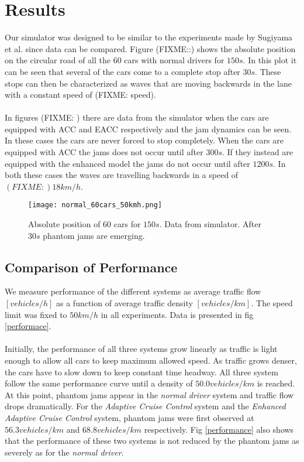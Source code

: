 \section{Results}
Our simulator was designed to be similar to the experiments made by Sugiyama
et al.\cite{sugiyama} since data can be compared. Figure (FIXME::) shows
the absolute position on the circular road of all the 60 cars with normal
drivers for $ 150 \unit{s} $. In this plot it can be seen that several of the
cars come to a complete stop after $ 30 \unit{s} $. These stops can then be
characterized as waves \cite{mit} that are moving backwards in the lane with
a constant speed of (FIXME: speed).\\\\


In figures (FIXME: ) there are data from the simulator when the cars are
equipped with ACC and EACC respectively and the jam dynamics can be seen. In
these cases the cars are never forced to stop completely. When the cars
are equipped with ACC the jams does not occur until after $ 300 \unit{s}
$. If they instead are equipped with the enhanced model the jams do not occur
until after $ 1200 \unit{s} $. In both these cases the waves are travelling
backwards in a speed of $ (FIXME:) 18 \unit{km/h} $.



\begin{figure}[h!]
    \begin{center}
    \texttt{[image: normal\_60cars\_50kmh.png]}
    \caption{\label{normal_postime}
Absolute position of 60 cars for $ 150 \unit{s} $. Data from simulator. After $ 30 \unit{s} $ phantom jams are emerging.}
    \end{center}
\end{figure}


\subsection{Comparison of Performance}
We measure performance of the different systems as average traffic flow
$ [\unit{vehicles/h}] $ as a function of average traffic density
$ [\unit{vehicles/km}] $. The speed limit was fixed to $ 50 \unit{km/h} $ in all
experiments. Data is presented in fig \ref{performace}.\\\\

Initially, the performance of all three systems grow linearly as traffic is
light enough to allow all cars to keep maximum allowed speed. As traffic grows
denser, the cars have to slow down to keep constant time headway. All three
system follow the same performance curve until a density of $ 50.0
\unit{vehicles/km} $ is reached. At this point, phantom jams appear in the
\emph{normal driver} system and traffic flow drops dramatically. For the
\emph{Adaptive Cruise Control} system and the \emph{Enhanced Adaptive Cruise
Control} system, phantom jams were first observed at $ 56.3 \unit{vehicles/km} $
and $ 68.8 \unit{vehicles/km} $ respectively. Fig \ref{performance} also shows
that the performance of these two systems is not reduced by the phantom jams
as severely as for the \emph{normal driver}.

